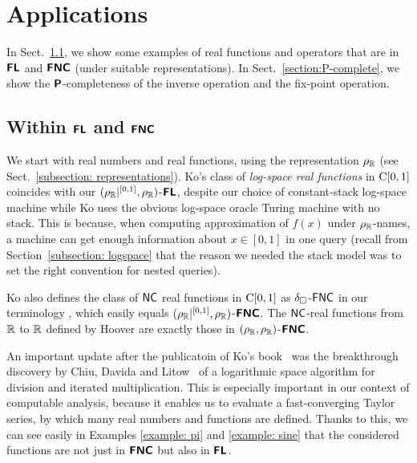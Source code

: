 \documentclass[a4paper,UKenglish]{lipics}
\begin{document}
\section{Applications}
\label{section:applications}

In Sect.~\ref{section:function}, 
we show some examples of real functions and operators 
that are in $\text{\bfseries \sffamily \upshape FL}$ and $\text{\bfseries \sffamily \upshape FNC}$ (under suitable representations). 
In Sect.~\ref{section:P-complete}, we show the $\text{\bfseries \sffamily \upshape P}$-completeness of 
the inverse operation and the fix-point operation.

\subsection{Within $\text{\bfseries \sffamily \upshape FL}$ and $\text{\bfseries \sffamily \upshape FNC}$}
\label{section:function}

We start with real numbers and real functions, 
using the representation $\rho _\mathbb R$
(see Sect.~\ref{subsection: representations}). 
Ko's class of
\emph{log-space real functions} in $\mathrm C[0,1]$ 
\cite{ko1991complexity} 
coincides with our $(\rho _\mathbb R|^{[0,1]}, \rho _\mathbb R)$-$\text{\bfseries \sffamily \upshape FL}$, 
despite our choice of constant-stack log-space machine 
while Ko uses the obvious log-space oracle Turing machine 
with no stack.
This is because, 
when computing approximation of $f(x)$ under $\rho _\mathbb R$-names, 
a machine can get enough information about $x \in [0,1]$ in one query
(recall from Section~\ref{subsection: logspace} that 
the reason we needed the stack model 
was to set the right convention for nested queries).

Ko also defines the class of $\mathsf{NC}$ real functions in $\mathrm C[0,1]$
as $\delta _\square$-$\mathsf{FNC}$ in our terminology 
\cite{ko1991complexity},
which easily equals $(\rho _\mathbb R|^{[0,1]}, \rho _\mathbb R)$-$\text{\bfseries \sffamily \upshape FNC}$.
The $\mathsf{NC}$-real functions from $\mathbb R$ to $\mathbb R$ defined by Hoover \cite{hoover1991real}
are exactly those in $(\rho _\mathbb R, \rho _\mathbb R)$-$\text{\bfseries \sffamily \upshape FNC}$.

An important update after the publicatoin of Ko's book~\cite{ko1991complexity} was the 
breakthrough discovery by Chiu, Davida and Litow~\cite{chiu2001division}
of a logarithmic space algorithm 
for division and iterated multiplication. 
This is especially important in our context of computable analysis, 
because it enables us to evaluate a fast-converging Taylor series, 
by which many real numbers and functions are defined. 
Thanks to this, we can see easily
in Examples \ref{example: pi} and \ref{example: sine}
that the considered functions are not just in $\text{\bfseries \sffamily \upshape FNC}$ but also in $\text{\bfseries \sffamily \upshape FL}$. 
\end{document}
